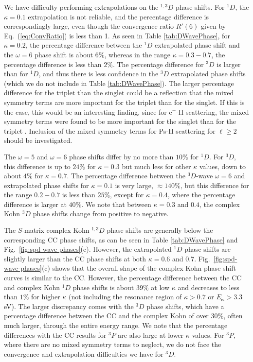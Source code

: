 \documentclass[preprint,showpacs,showkeys,preprintnumbers,amsmath,amssymb,longbibliography,pra,aps]{revtex4-1}
\begin{document}
{We have difficulty performing extrapolations on the $^{1,3}D$ phase shifts.
For $^1D$, the $\kappa = 0.1$ extrapolation is not reliable, and the
percentage difference is correspondingly large, even though the
convergence ratio $R'(6)$ given by Eq.~(\ref{eq:ConvRatio}) is less than 1. As seen in Table
\ref{tab:DWavePhase}, for $\kappa = 0.2$, the percentage difference
between the $^1D$ extrapolated phase shift and the $\omega = 6$ 
phase shift is about $6\%$,
whereas in the range $\kappa = 0.3 - 0.7$, the percentage difference is
less than $2\%$. The percentage difference for $^3D$ is larger than for $^1D$,
and thus there is less confidence in the $^3D$ extrapolated phase shifts (which we
do not include in Table \ref{tab:DWavePhase}). The larger percentage
difference for the triplet than the singlet could be a reflection that the
mixed symmetry terms are more important for the
triplet than for the singlet. If this is the case, this would be an interesting
finding, since for e$^-$-H scattering, the mixed symmetry terms were found to
be more important for the singlet than
for the triplet \cite{VanReeth2015}. Inclusion of the mixed symmetry terms for
Ps-H scattering for $\ell \geq 2$ should be investigated.

The $\omega = 5$ and $\omega = 6$ phase shifts differ by no more than
$10\%$ for $^1D$. For $^3D$, this difference is up to $24\%$ for
$\kappa=0.3$ but much less for other $\kappa$ values, down to
about $4\%$ for $\kappa = 0.7$.
The percentage difference between the $^3D$-wave $\omega = 6$ and extrapolated
phase shifts for $\kappa = 0.1$ is very large,
$\approx 140\%$, but this difference for the range $0.2 - 0.7$
is less than $25\%$, except for $\kappa = 0.4$, where the percentage
difference is larger at $40\%$. We note that between $\kappa = 0.3$
and $0.4$, the complex Kohn $^3D$ phase shifts change from positive 
to negative.

The $S$-matrix complex Kohn $^{1,3}D$ phase shifts are generally below the corresponding 
CC phase shifts, as can be seen in Table \ref{tab:DWavePhase} and
Fig.~\ref{fig:spd-wave-phases}(c). However, the extrapolated $^1D$ phase shifts
are slightly larger than the CC phase shifts at both $\kappa = 0.6$ and 0.7.
Fig.~\ref{fig:spd-wave-phases}(c) shows that the overall shape of the complex Kohn 
phase shift curves is similar to the CC. However, the percentage difference 
between the CC and complex Kohn $^1D$ phase shifts is about $39\%$ at low
$\kappa$ and decreases to less than $1\%$ for higher $\kappa$ (not including 
the resonance region of $\kappa > 0.7$ or $E_{ \bm \kappa} > 3.3$ eV). The 
larger discrepancy comes with the $^3D$ phase shifts, which have a percentage 
difference between the CC and the complex Kohn of over 30\%, often much 
larger, through the entire energy range. We note that the percentage 
differences with the CC results for $^3P$ are also large at lower $\kappa$ 
values. For $^3P$, where there are no mixed symmetry terms to neglect,
we do not face the convergence and extrapolation 
difficulties we have for $^3D$.

}
\end{document}
